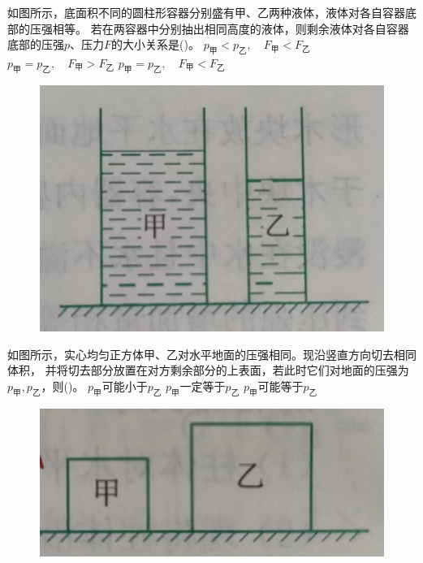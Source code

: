 \documentclass[a4paper,cs4size]{BHCexam}
\begin{document}
\begin{groups}
\begin{questions}[]
        \question[5] 如图所示，底面积不同的圆柱形容器分别盛有甲、乙两种液体，液体对各自容器底部的压强相等。
        若在两容器中分别抽出相同高度的液体，则剩余液体对各自容器底部的压强$p$、压力$F$的大小关系是(\quad\quad\quad)。
        {$p_{\text{甲}}<p_{\text{乙}},\quad F_{\text{甲}}<F_{\text{乙}}$}
        {$p_{\text{甲}}=p_{\text{乙}},\quad F_{\text{甲}}>F_{\text{乙}}$}
        {$p_{\text{甲}}=p_{\text{乙}},\quad F_{\text{甲}}<F_{\text{乙}}$}
        \begin{figure}[htb]
            \flushright
            \includegraphics [scale=0.4,trim=0 0 0 0]{./image/physics_pressure_6.png}
            \label{fig:fig_pressure_6}
        \end{figure}
        \vspace{5cm}

        \question[5] 如图所示，实心均匀正方体甲、乙对水平地面的压强相同。现沿竖直方向切去相同体积，
        并将切去部分放置在对方剩余部分的上表面，若此时它们对地面的压强为$p_{\text{甲}},p_{\text{乙}}$，则(\quad\quad\quad)。
        {$p_{\text{甲}}$可能小于$p_{\text{乙}}$}
        {$p_{\text{甲}}$一定等于$p_{\text{乙}}$}
        {$p_{\text{甲}}$可能等于$p_{\text{乙}}$}
        \begin{figure}[htb]
            \flushright
            \includegraphics [scale=0.4,trim=0 0 0 0]{./image/physics_pressure_7.png}
            \label{fig:fig_pressure_7}
        \end{figure}
        \vspace{6.5cm}


\end{questions}
\end{groups}
\end{document}
